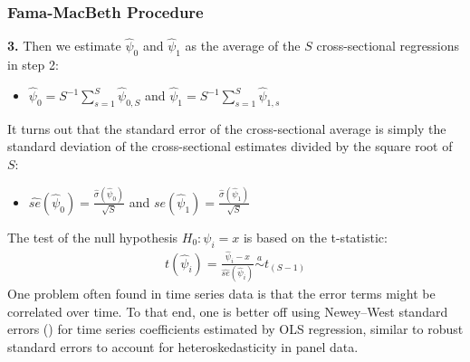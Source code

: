 \documentclass[xcolor=dvipsnames, english, 8pt]{beamer}
\begin{document}
\begin{frame}
    \frametitle{Fama-MacBeth Procedure}

    \textbf{3.} {\color{ubRed} Then we estimate $\hat{\psi}_0$ and $\hat{\psi}_1$ as the average of the $S$ cross-sectional regressions} in step 2:\vspace{0.25cm}\\
    \begin{itemize}
        \item $\hat{\psi}_0 = S^{-1} \sum_{s=1}^S \hat{\psi}_{0,S}$ and $\hat{\psi}_1 = S^{-1} \sum_{s=1}^S \hat{\psi}_{1,s}$\vspace{0.25cm}\\
    \end{itemize}
It turns out that the standard error of the cross-sectional average is simply the standard deviation of the cross-sectional estimates divided by the square root of $S$: \vspace{0.25cm}\\
\begin{itemize}
    \item $\hat{se}(\hat{\psi}_0) = \frac{\hat{\sigma}(\hat{\psi}_0)}{\sqrt{S}}$ and $se(\hat{\psi}_1) = \frac{\hat{\sigma}(\hat{\psi}_1)}{\sqrt{S}}$ \vspace{0.25cm}\\
\end{itemize}
The test of the null hypothesis $H_0: \psi_i = x$ is based on the t-statistic:
\begin{align}
    t(\hat{\psi}_i) = \frac{\hat{\psi}_i - x}{\hat{se}(\hat{\psi}_i)} \overset{a}{\sim} t_{(S-1)}
\end{align}
One problem often found in time series data is that the error terms might be correlated over time. To that end, one is better off using {\color{ubRed}Newey–West standard errors} (\cite{Newey1987a}) for time series coefficients estimated by OLS regression, similar to robust standard errors to account for heteroskedasticity in panel data.
\end{frame}
\end{document}
